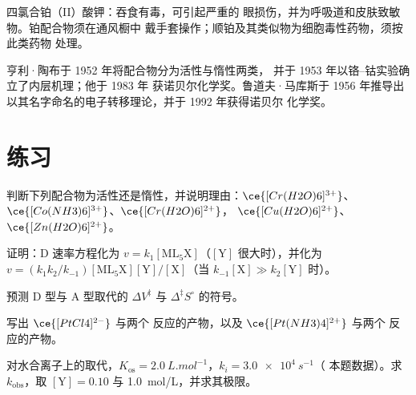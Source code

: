 \begin{safety}{}
四氯合铂（II）酸钾：吞食有毒，可引起严重的
眼损伤，并为呼吸道和皮肤致敏物。铂配合物须在通风橱中
戴手套操作；顺铂及其类似物为细胞毒性药物，须按此类药物
处理。
\end{safety}

\begin{history}[陶布与马库斯]
亨利·陶布于 1952 年将配合物分为活性与惰性两类，
并于 1953 年以铬–钴实验确立了内层机理；他于 1983 年
获诺贝尔化学奖。鲁道夫·马库斯于 1956 年推导出
以其名字命名的电子转移理论，并于 1992 年获得诺贝尔
化学奖。
\end{history}

\section{练习}

\begin{exercise}[$\star$]\label{exo:b3:complex-mechanisms:1}
判断下列配合物为活性还是惰性，并说明理由：$\ce{[Cr(H2O)6]^{3+}}$、$\ce{[Co(NH3)6]^{3+}}$、$\ce{[Cr(H2O)6]^{2+}}$，
$\ce{[Cu(H2O)6]^{2+}}$、$\ce{[Zn(H2O)6]^{2+}}$。
\end{exercise}

\begin{exercise}[$\star$]\label{exo:b3:complex-mechanisms:2}
证明：D 速率方程化为 $v = k_1[\mathrm{ML_5X}]$（$[\mathrm Y]$ 很大时），并化为 $v = (k_1k_2/k_{-1})
[\mathrm{ML_5X}][\mathrm Y]/[\mathrm X]$（当 $k_{-1}[\mathrm X] \gg k_2[\mathrm Y]$ 时）。
\end{exercise}

\begin{exercise}[$\star$]\label{exo:b3:complex-mechanisms:3}
预测 D 型与 A 型取代的 $\Delta V^{\ddagger}$ 与 $\Delta^{\ddagger}S^\circ$ 的符号。
\end{exercise}

\begin{exercise}[$\star$]\label{exo:b3:complex-mechanisms:4}
写出 $\ce{[PtCl4]^{2-}}$ 与两个  反应的产物，以及 $\ce{[Pt(NH3)4]^{2+}}$ 与两个  反应的产物。
\end{exercise}

\begin{exercise}[$\star\star$]\label{exo:b3:complex-mechanisms:5}
对水合离子上的取代，$K_{\mathrm{os}} = \qty{2.0}{L.mol^{-1}}$，$k_i = \qty{3.0e4}{s^{-1}}$（
本题数据）。求 $k_{\mathrm{obs}}$，取 $[\mathrm Y] = 0.10$ 与 \qty{1.0}{mol/L}，并求其极限。
\end{exercise}

